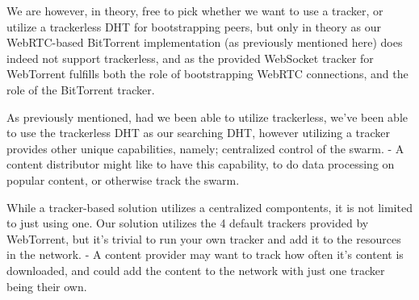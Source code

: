 We are however, in theory, free to pick whether we want to use a tracker, or 
utilize a trackerless DHT for bootstrapping peers, but only in theory as our
WebRTC-based BitTorrent implementation (as previously mentioned here) does
indeed not support trackerless, and as the provided WebSocket tracker for 
WebTorrent fulfills both the role of bootstrapping WebRTC connections, and the
role of the BitTorrent tracker.

As previously mentioned, had we been able to utilize trackerless, we've been
able to use the trackerless DHT as our searching DHT, however utilizing a
tracker provides other unique capabilities, namely; centralized control of the
swarm. 
\newline
- A content distributor might like to have this capability, to do data
processing on popular content, or otherwise track the swarm.

While a tracker-based solution utilizes a centralized compontents, it is not
limited to just using one. Our solution utilizes the 4 default trackers
provided by WebTorrent, but it's trivial to run your own tracker and add it to
the resources in the network.
\newline
- A content provider may want to track how often it's content is downloaded,
and could add the content to the network with just one tracker being their own.
